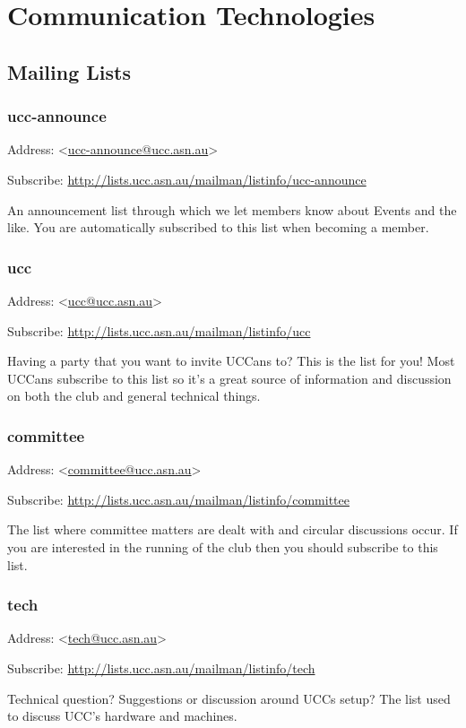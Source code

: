 \chapter{Communication Technologies}\label{Communications}


\newenvironment{ucclist}[1]
{
	\begin{mdframed}
	\subsection{#1}
	\begin{mdframed}
		Address:  <\href{mailto:#1@ucc.asn.au}{#1@ucc.asn.au}>
	\end{mdframed}
	\begin{mdframed}
		Subscribe:  \url{http://lists.ucc.asn.au/mailman/listinfo/#1}
	\end{mdframed}


	
}{\end{mdframed}}

\section{Mailing Lists}


\begin{ucclist}{ucc-announce}

An announcement list through which we let 
members know about Events and the like. You are automatically 
subscribed to this list when becoming a member. 

\end{ucclist}

\begin{ucclist}{ucc}

Having a party that you want to invite UCCans to? This is the 
list for you! Most UCCans subscribe to this list so it's a great 
source of information and discussion on both the club and general 
technical things. 

\end{ucclist}

\begin{ucclist}{committee}
The list where committee matters are dealt with and circular 
discussions occur. If you are interested in the running of the club then 
you should subscribe to this list. 
\end{ucclist}

\begin{ucclist}{tech}
Technical question? Suggestions or discussion around UCCs setup? 
The list used to discuss UCC's hardware and machines. 
\end{ucclist}


